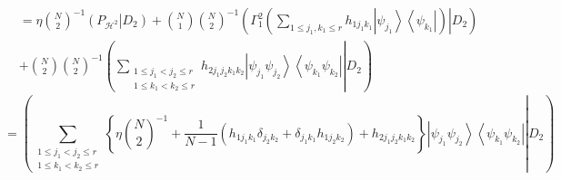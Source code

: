 \documentclass[aps,preprint]{revtex4}%
\begin{document}
\begin{align}
&  =\eta\binom{N}{2}^{-1}\left(  \left.  P_{\mathcal{H}^{2}}\right\vert
D_{2}\right)  +\binom{N}{1}\binom{N}{2}^{-1}\left(  \left.  \Gamma_{1}%
^{2}\left(  \sum_{1\leq j_{1},k_{1}\leq r}h_{1j_{1}k_{1}}\left\vert
\psi_{j_{1}}\right\rangle \left\langle \psi_{k_{1}}\right\vert \right)
\right\vert D_{2}\right) \\
&  +\binom{N}{2}\binom{N}{2}^{-1}\left(  \left.  \sum_{\substack{1\leq
j_{1}<j_{2}\leq r\\1\leq k_{1}<k_{2}\leq r}}h_{2j_{1}j_{2}k_{1}k_{2}%
}\left\vert \psi_{j_{1}}\psi_{j_{2}}\right\rangle \left\langle \psi_{k_{1}%
}\psi_{k_{2}}\right\vert \right\vert D_{2}\right)
\end{align}%
\begin{equation}
=\left(  \left.  \sum_{\substack{1\leq j_{1}<j_{2}\leq r\\1\leq k_{1}%
<k_{2}\leq r}}\left\{  \eta\binom{N}{2}^{-1}+\frac{1}{N-1}\left(
h_{1j_{1}k_{1}}\delta_{j_{2}k_{2}}+\delta_{j_{1}k_{1}}h_{1j_{2}k_{2}}\right)
+h_{2j_{1}j_{2}k_{1}k_{2}}\right\}  \left\vert \psi_{j_{1}}\psi_{j_{2}%
}\right\rangle \left\langle \psi_{k_{1}}\psi_{k_{2}}\right\vert \right\vert
D_{2}\right)
\end{equation}
\end{document}
